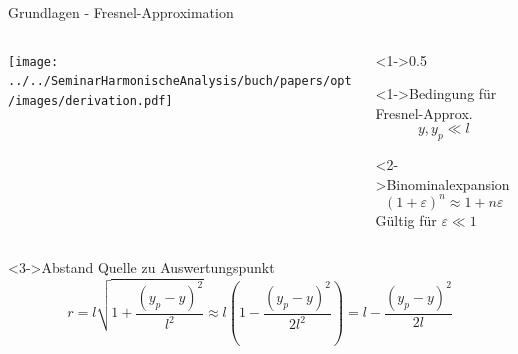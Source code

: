 \begin{frame}{Grundlagen - Fresnel-Approximation}
    \begin{columns}
        \begin{column}{0.5\textwidth}
            \centering
            \texttt{[image: ../../SeminarHarmonischeAnalysis/buch/papers/opt/images/derivation.pdf]}
        \end{column}

        \begin{column}<1->{0.5\textwidth}
            \begin{alertblock}<1->{Bedingung für Fresnel-Approx.}
                \begin{equation*}
                    y, y_p
                    \ll
                    l
                \end{equation*}
            \end{alertblock}
            \begin{block}<2->{Binominalexpansion}
                \begin{equation*}
                    (1 + \varepsilon)^n
                    \approx
                    1 + n\varepsilon
                \end{equation*}
                \centering
                Gültig für $\varepsilon \ll 1$
            \end{block}
        \end{column}
    \end{columns}
    \begin{block}<3->{Abstand Quelle zu Auswertungspunkt}
        \begin{equation*}
            r
            =
            l \sqrt{1 + \frac{(y_p-y)^2}{l^2}}
            \approx
            l \left(1 - \frac{(y_p-y)^2}{2l^2}\right)
            =
            l - \frac{(y_p-y)^2}{2l}
        \end{equation*}
    \end{block}
\end{frame}

